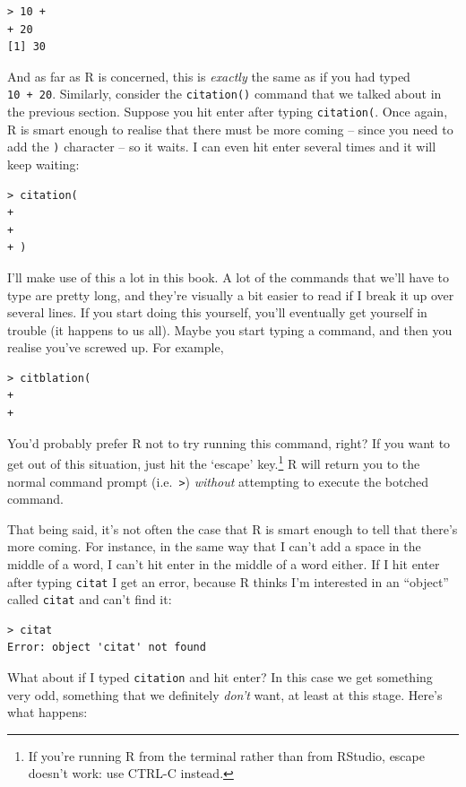 \documentclass[
]{book}
\begin{document}
\begin{verbatim}
> 10 +
+ 20
[1] 30
\end{verbatim}

And as far as R is concerned, this is \emph{exactly} the same as if you had typed \texttt{10\ +\ 20}. Similarly, consider the \texttt{citation()} command that we talked about in the previous section. Suppose you hit enter after typing \texttt{citation(}. Once again, R is smart enough to realise that there must be more coming -- since you need to add the \texttt{)} character -- so it waits. I can even hit enter several times and it will keep waiting:

\begin{verbatim}
> citation(
+ 
+ 
+ )
\end{verbatim}

I'll make use of this a lot in this book. A lot of the commands that we'll have to type are pretty long, and they're visually a bit easier to read if I break it up over several lines. If you start doing this yourself, you'll eventually get yourself in trouble (it happens to us all). Maybe you start typing a command, and then you realise you've screwed up. For example,

\begin{verbatim}
> citblation( 
+ 
+ 
\end{verbatim}

You'd probably prefer R not to try running this command, right? If you want to get out of this situation, just hit the `escape' key.\footnote{If you're running R from the terminal rather than from RStudio, escape doesn't work: use CTRL-C instead.} R will return you to the normal command prompt (i.e.~\texttt{\textgreater{}}) \emph{without} attempting to execute the botched command.

That being said, it's not often the case that R is smart enough to tell that there's more coming.
For instance, in the same way that I can't add a space in the middle of a word, I can't hit enter in the middle of a word either. If I hit enter after typing \texttt{citat} I get an error, because R thinks I'm interested in an ``object'' called \texttt{citat} and can't find it:

\begin{verbatim}
> citat
Error: object 'citat' not found
\end{verbatim}

What about if I typed \texttt{citation} and hit enter? In this case we get something very odd, something that we definitely \emph{don't} want, at least at this stage. Here's what happens:
\end{document}
